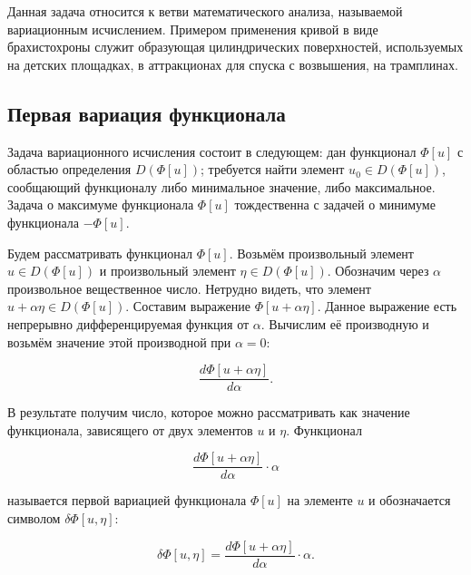 \documentclass{article}
\begin{document}
\begin{info}
	Данная задача относится к ветви математического анализа, называемой вариационным исчислением. Примером применения кривой в виде брахистохроны служит образующая цилиндрических поверхностей, используемых на детских площадках, в аттракционах для спуска с возвышения, на трамплинах.
\end{info}


\subsection{Первая вариация функционала}

Задача вариационного исчисления состоит в следующем: дан функционал $\Phi[u]$ с областью определения $D(\Phi[u])$; требуется найти элемент $u_{0} \in D(\Phi[u])$, сообщающий функционалу либо минимальное значение, либо максимальное. Задача о максимуме функционала $\Phi[u]$ тождественна с задачей о минимуме функционала $- \Phi[u]$.

Будем рассматривать функционал $\Phi[u]$. Возьмём произвольный элемент $u \in D(\Phi[u])$ и произвольный элемент $\eta \in D(\Phi[u]) $. Обозначим через $\alpha$ произвольное вещественное число. Нетрудно видеть, что элемент $ u + \alpha \eta \in D(\Phi[u])$. Составим выражение $\Phi[u + \alpha \eta]$. Данное выражение есть непрерывно дифференцируемая функция от $\alpha$. Вычислим её производную и возьмём значение этой производной при $\alpha = 0$:

\begin{displaymath}
    \frac{d\Phi[u + \alpha \eta]}{d\alpha}.
\end{displaymath}

\noindent В результате получим число, которое можно рассматривать как значение функционала, зависящего от двух элементов $u$ и $\eta$. Функционал

\begin{displaymath}
    \frac{d\Phi[u + \alpha \eta]}{d\alpha} \cdot \alpha
\end{displaymath}

\noindent называется первой вариацией функционала $\Phi[u]$ на элементе $u$ и обозначается символом $\delta \Phi[u, \eta]$:

\begin{displaymath}
     \delta \Phi[u, \eta] = \frac{d\Phi[u + \alpha \eta]}{d\alpha} \cdot \alpha.
\end{displaymath}
\end{document}
